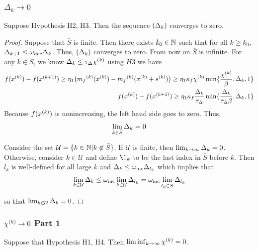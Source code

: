 \subsubsection{$\Delta_k \to 0$}
\begin{theorem}
Suppose Hypothesis H2, H3. Then the sequence $(\Delta_k)$ converges to zero.
\end{theorem}
 
\begin{proof}

Suppose that $\bar{S}$ is finite. Then there exists $k_0 \in \mathbb N$ such that for all $k \ge  k_0$, $\Delta_{k+1} \le \omega_{\text{dec}} \Delta_k$.
Thus, $(\Delta_k)$ converges to zero.
From now on $\bar{S}$ is infinite.
For any $k \in \bar{S}$, we know $\Delta_k \le \tau_{\Delta} {\chi^{(k)}}$ using $H3$ we have
\begin{align*}
f({x}^{(k)}) -  f({{x}^{(k+1)}}) \ge \eta_1 \big ({{m}_f}^{(k)}({x}^{(k)}) - {{m}_f}^{(k)}({x}^{(k)} + {{s}^{(k)}})\big ) \ge \eta_1 \kappa_f {\chi^{(k)}} \min\{\frac{{\chi^{(k)}}}{\beta}, \Delta_k, 1\}\\
f({x}^{(k)}) - f({{x}^{(k+1)}}) \ge \eta_1\kappa_f\frac{\Delta_k}{\tau_{\Delta}}\min\{\frac{\Delta_k}{\tau_{\Delta} \beta}, \Delta_k, 1\}
\end{align*}
Because $f({x}^{(k)})$ is nonincreasing, the left hand side goes to zero.
Thus,
\begin{align}
\lim_{k \in \bar{S}} \Delta_k = 0
\end{align}


Consider the set
$\mathcal U = \{ k \in \mathbb N | k \not \in \bar S \}$.
If $\mathcal U$ is finite, then $\lim_{k\to\infty}\Delta_k = 0$.
Otherwise, consider $k \in \mathcal U$ and define $\l_k$ to be the last index in $\bar S$ before $k$.
Then $l_k$ is well-defined for all large $k$  and $\Delta_k \le \omega_{\text{inc}} \Delta_{l_k}$ which implies that
\begin{align}
\lim_{k \in \mathcal U } \Delta_k \le \omega_{\text{inc}} \lim_{k \in \mathcal U} \Delta_{l_k} = \omega_{\text{inc}} \lim_{l_k \in \bar{S}} \Delta_{l_k}
\end{align}

so that $\lim_{k \in \mathcal U} \Delta_k = 0$.

\end{proof}




\subsubsection{${\chi^{(k)}} \to 0$ Part 1}
\begin{theorem}
Suppose that Hypothesis H1, H4. Then $\liminf_{k\to\infty} {\chi^{(k)}} = 0$.
\end{theorem}
 
